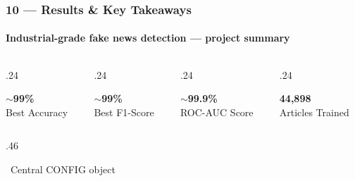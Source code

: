 \documentclass[aspectratio=169,10pt]{beamer}
\begin{document}
\begin{frame}[t]
\frametitle{10 --- Results \& Key Takeaways}
\framesubtitle{Industrial-grade fake news detection --- project summary}
\vspace{.06cm}
\begin{columns}[T]
\begin{column}{.24\textwidth}
  \begin{tcolorbox}[statbox={BlueL},colframe=ABlue]
    {\Large\bfseries\color{ABlue}$\sim$99\%}\\[2pt]{\tiny\color{ABlue}Best Accuracy}
  \end{tcolorbox}
\end{column}
\begin{column}{.24\textwidth}
  \begin{tcolorbox}[statbox={GreenL},colframe=AGreen]
    {\Large\bfseries\color{AGreen}$\sim$99\%}\\[2pt]{\tiny\color{AGreen}Best F1-Score}
  \end{tcolorbox}
\end{column}
\begin{column}{.24\textwidth}
  \begin{tcolorbox}[statbox={PurpleL},colframe=APurple]
    {\Large\bfseries\color{APurple}$\sim$99.9\%}\\[2pt]{\tiny\color{APurple}ROC-AUC Score}
  \end{tcolorbox}
\end{column}
\begin{column}{.24\textwidth}
  \begin{tcolorbox}[statbox={OrangeL},colframe=AOrange]
    {\Large\bfseries\color{AOrange}44,898}\\[2pt]{\tiny\color{AOrange}Articles Trained}
  \end{tcolorbox}
\end{column}
\end{columns}
\vspace{.1cm}
\begin{columns}[T]
\begin{column}{.46\textwidth}
  \begin{tcolorbox}[mycard={BlueMid}{ABlue},title={\footnotesize\textbf{Industrial Additions}},
      colbacktitle=NavyML,coltitle=white]
    \scriptsize
    \ Central CONFIG object\\[1pt]

\end{tcolorbox}
\end{column}
\end{columns}
\end{frame}
\end{document}
